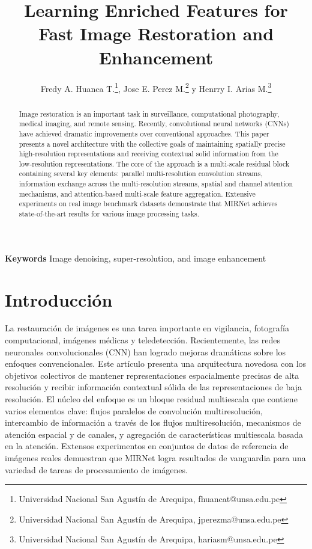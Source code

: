 \documentclass[a4paper,
               ]{jacow}
\newenvironment{keywords}
{\par\small\textbf{Keywords}}
{\par}
\begin{document}
\title{Learning Enriched Features for Fast Image Restoration and Enhancement}

\author{Fredy A. Huanca T.\thanks{Universidad Nacional San Agustín de Arequipa, fhuancat@unsa.edu.pe},
		Jose E. Perez M.\thanks{Universidad Nacional San Agustín de Arequipa, jperezma@unsa.edu.pe} y
		Henrry I. Arias M.\thanks{Universidad Nacional San Agustín de Arequipa, hariasm@unsa.edu.pe}}
	
\maketitle

%
\begin{abstract}
Image restoration is an important task in surveillance, computational photography, medical imaging, and remote sensing. Recently, convolutional neural networks (CNNs) have achieved dramatic improvements over conventional approaches. This paper presents a novel architecture with the collective goals of maintaining spatially precise high-resolution representations and receiving contextual solid information from the low-resolution representations. The core of the approach is a multi-scale residual block containing several key elements: parallel multi-resolution convolution streams, information exchange across the multi-resolution streams, spatial and channel attention mechanisms, and attention-based multi-scale feature aggregation. Extensive experiments on real image benchmark datasets demonstrate that MIRNet achieves state-of-the-art results for various image processing tasks.
\end{abstract}

\begin{keywords}
Image denoising, super-resolution, and image enhancement
\end{keywords}

\section{Introducción}

La restauración de imágenes es una tarea importante en vigilancia, fotografía computacional, imágenes médicas y teledetección. Recientemente, las redes neuronales convolucionales (CNN) han logrado mejoras dramáticas sobre los enfoques convencionales. Este artículo presenta una arquitectura novedosa con los objetivos colectivos de mantener representaciones espacialmente precisas de alta resolución y recibir información contextual sólida de las representaciones de baja resolución. El núcleo del enfoque es un bloque residual multiescala que contiene varios elementos clave: flujos paralelos de convolución multiresolución, intercambio de información a través de los flujos multiresolución, mecanismos de atención espacial y de canales, y agregación de características multiescala basada en la atención. Extensos experimentos en conjuntos de datos de referencia de imágenes reales demuestran que MIRNet logra resultados de vanguardia para una variedad de tareas de procesamiento de imágenes.
\end{document}
